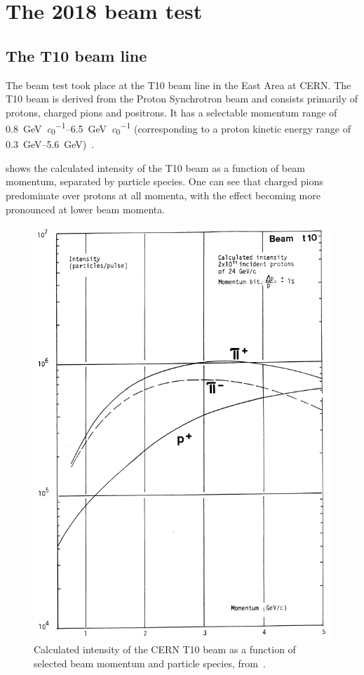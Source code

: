\section{The 2018 beam test}
\label{sec:hptpc_beam_flux:overview}

\subsection{The T10 beam line}
\label{sec:hptpc_beam_flux:overview:t10}

The beam test took place at the T10 beam line in the East Area at CERN.
The T10 beam is derived from the Proton Synchrotron beam and consists primarily of protons, charged pions and positrons.
It has a selectable momentum range of \SIrange{0.8}{6.5}{\giga\electronvolt\per\clight} (corresponding to a proton kinetic energy range of \SIrange{0.3}{5.6}{\giga\electronvolt})~\cite{t10Report}.

 shows the calculated intensity of the T10 beam as a function of beam momentum, separated by particle species.
One can see that charged pions predominate over protons at all momenta, with the effect becoming more pronounced at lower beam momenta.

\begin{figure}[h]
  \centering
  \includegraphics[width=.6\linewidth]{files/figures/hptpc_beam_flux/t10Comp}
  \caption[Calculated intensity of the CERN T10 beam as a function of selected beam momentum and particle species.]{Calculated intensity of the CERN T10 beam as a function of selected beam momentum and particle species, from~\cite{t10Report}.}
  \label{fig:t10Calc}
\end{figure}

